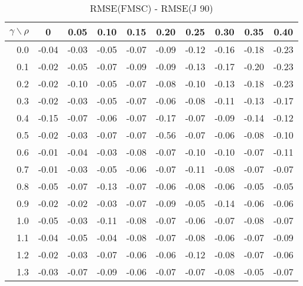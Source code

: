 \documentclass[12pt]{article}
\begin{document}
%
\begin{table}[!tbp]
\caption{RMSE(FMSC) - RMSE(J 90)}
 \begin{center}
 \begin{tabular}{r|rrrrrrrrr}\hline\hline
\multicolumn{1}{c|}{$\gamma\backslash\rho$}&\multicolumn{1}{c}{0}&\multicolumn{1}{c}{0.05}&\multicolumn{1}{c}{0.10}&\multicolumn{1}{c}{0.15}&\multicolumn{1}{c}{0.20}&\multicolumn{1}{c}{0.25}&\multicolumn{1}{c}{0.30}&\multicolumn{1}{c}{0.35}&\multicolumn{1}{c}{0.40}\tabularnewline
\hline

0.0&-0.04&-0.03&-0.05&-0.07&-0.09&-0.12&-0.16&-0.18&-0.23\tabularnewline
0.1&-0.02&-0.05&-0.07&-0.09&-0.09&-0.13&-0.17&-0.20&-0.23\tabularnewline
0.2&-0.02&-0.10&-0.05&-0.07&-0.08&-0.10&-0.13&-0.18&-0.23\tabularnewline
0.3&-0.02&-0.03&-0.05&-0.07&-0.06&-0.08&-0.11&-0.13&-0.17\tabularnewline
0.4&-0.15&-0.07&-0.06&-0.07&-0.17&-0.07&-0.09&-0.14&-0.12\tabularnewline
0.5&-0.02&-0.03&-0.07&-0.07&-0.56&-0.07&-0.06&-0.08&-0.10\tabularnewline
0.6&-0.01&-0.04&-0.03&-0.08&-0.07&-0.10&-0.10&-0.07&-0.11\tabularnewline
0.7&-0.01&-0.03&-0.05&-0.06&-0.07&-0.11&-0.08&-0.07&-0.07\tabularnewline
0.8&-0.05&-0.07&-0.13&-0.07&-0.06&-0.08&-0.06&-0.05&-0.05\tabularnewline
0.9&-0.02&-0.02&-0.03&-0.07&-0.09&-0.05&-0.14&-0.06&-0.06\tabularnewline
1.0&-0.05&-0.03&-0.11&-0.08&-0.07&-0.06&-0.07&-0.08&-0.07\tabularnewline
1.1&-0.04&-0.05&-0.04&-0.08&-0.07&-0.08&-0.06&-0.07&-0.09\tabularnewline
1.2&-0.02&-0.03&-0.07&-0.06&-0.06&-0.12&-0.08&-0.07&-0.06\tabularnewline
1.3&-0.03&-0.07&-0.09&-0.06&-0.07&-0.07&-0.08&-0.05&-0.07\tabularnewline
\hline
\end{tabular}

\end{center}

\end{table}
\end{document}
